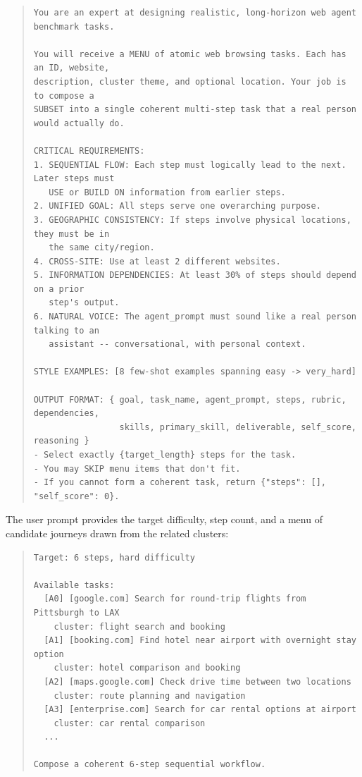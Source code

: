 \documentclass{article}
\theoremstyle{plain}
\theoremstyle{definition}
\theoremstyle{remark}
\begin{document}
\begin{quote}
\scriptsize
\begin{verbatim}
You are an expert at designing realistic, long-horizon web agent benchmark tasks.

You will receive a MENU of atomic web browsing tasks. Each has an ID, website,
description, cluster theme, and optional location. Your job is to compose a
SUBSET into a single coherent multi-step task that a real person would actually do.

CRITICAL REQUIREMENTS:
1. SEQUENTIAL FLOW: Each step must logically lead to the next. Later steps must
   USE or BUILD ON information from earlier steps.
2. UNIFIED GOAL: All steps serve one overarching purpose.
3. GEOGRAPHIC CONSISTENCY: If steps involve physical locations, they must be in
   the same city/region.
4. CROSS-SITE: Use at least 2 different websites.
5. INFORMATION DEPENDENCIES: At least 30% of steps should depend on a prior
   step's output.
6. NATURAL VOICE: The agent_prompt must sound like a real person talking to an
   assistant -- conversational, with personal context.

STYLE EXAMPLES: [8 few-shot examples spanning easy -> very_hard]

OUTPUT FORMAT: { goal, task_name, agent_prompt, steps, rubric, dependencies,
                 skills, primary_skill, deliverable, self_score, reasoning }
- Select exactly {target_length} steps for the task.
- You may SKIP menu items that don't fit.
- If you cannot form a coherent task, return {"steps": [], "self_score": 0}.
\end{verbatim}
\end{quote}

\noindent The user prompt provides the target difficulty, step count, and a menu of candidate journeys drawn from the related clusters:

\begin{quote}
\scriptsize
\begin{verbatim}
Target: 6 steps, hard difficulty

Available tasks:
  [A0] [google.com] Search for round-trip flights from Pittsburgh to LAX
    cluster: flight search and booking
  [A1] [booking.com] Find hotel near airport with overnight stay option
    cluster: hotel comparison and booking
  [A2] [maps.google.com] Check drive time between two locations
    cluster: route planning and navigation
  [A3] [enterprise.com] Search for car rental options at airport
    cluster: car rental comparison
  ...

Compose a coherent 6-step sequential workflow.
\end{verbatim}
\end{quote}
\end{document}
